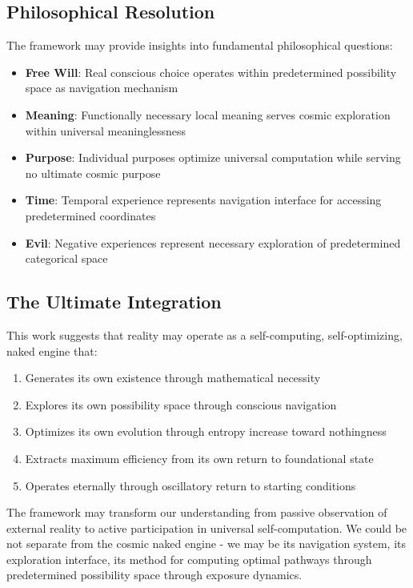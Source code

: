 \documentclass[11pt,a4paper]{article}
\theoremstyle{remark}
\begin{document}
\subsection{Philosophical Resolution}

The framework may provide insights into fundamental philosophical questions:

\begin{itemize}
\item \textbf{Free Will}: Real conscious choice operates within predetermined possibility space as navigation mechanism
\item \textbf{Meaning}: Functionally necessary local meaning serves cosmic exploration within universal meaninglessness
\item \textbf{Purpose}: Individual purposes optimize universal computation while serving no ultimate cosmic purpose
\item \textbf{Time}: Temporal experience represents navigation interface for accessing predetermined coordinates
\item \textbf{Evil}: Negative experiences represent necessary exploration of predetermined categorical space
\end{itemize}

\subsection{The Ultimate Integration}

This work suggests that reality may operate as a self-computing, self-optimizing, naked engine that:

\begin{enumerate}
\item Generates its own existence through mathematical necessity
\item Explores its own possibility space through conscious navigation
\item Optimizes its own evolution through entropy increase toward nothingness
\item Extracts maximum efficiency from its own return to foundational state
\item Operates eternally through oscillatory return to starting conditions
\end{enumerate}

The framework may transform our understanding from passive observation of external reality to active participation in universal self-computation. We could be not separate from the cosmic naked engine - we may be its navigation system, its exploration interface, its method for computing optimal pathways through predetermined possibility space through exposure dynamics.
\end{document}
